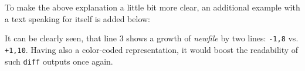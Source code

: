 To make the above explanation a little bit more clear, an additional example with a text speaking for itself is added below:



It can be clearly seen, that line 3 shows a growth of \emph{newfile} by two lines: \texttt{-1,8} vs. \texttt{+1,10}. Having also a color-coded representation, it would boost the readability of such \texttt{diff} outputs once again.
